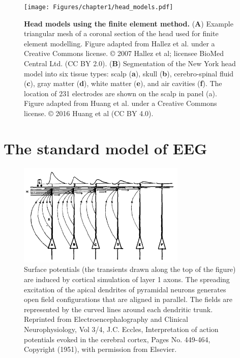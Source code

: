 \begin{figure}[t!]
    \centering
    \texttt{[image: Figures/chapter1/head\_models.pdf]}
    
    \caption[Head models using the finite element method]{\textbf{Head models using the finite element method.} 
    (\textbf{A}) Example triangular mesh of a coronal section of the head used for finite element modelling. Figure adapted from Hallez et al. \cite{Hallez2007} under a Creative Commons license. © 2007 Hallez et al; licensee BioMed Central Ltd. (CC BY 2.0).
    (\textbf{B}) Segmentation of the New York head model into six tissue types: scalp (\textbf{a}), skull (\textbf{b}), cerebro-spinal fluid (\textbf{c}), gray matter (\textbf{d}), white matter (\textbf{e}), and air cavities (\textbf{f}). The location of 231 electrodes are shown on the scalp in panel (a). Figure adapted from Huang et al. \cite{Huang2016} under a Creative Commons license. © 2016 Huang et al (CC BY 4.0).
    } 
    \label{fig:FEM_mesh}
\end{figure}

\section{The standard model of EEG} \label{sec:standard_model}

\begin{figure}
\vspace{-15pt}
\includegraphics[width=80mm]{Figures/chapter1/Eccles_1951.png}
\vspace{-20pt}
\caption[Early model of EEG generation by Eccles (1951)]{ Surface potentials (the transients drawn along the top of the figure) are induced by cortical simulation of layer 1 axons. The spreading excitation of the apical dendrites of pyramidal neurons generates open field configurations that are aligned in parallel. The fields are represented by the curved lines around each dendritic trunk. Reprinted from Electroencephalography and Clinical Neurophysiology, Vol 3/4, J.C. Eccles, Interpretation of action potentials evoked in the cerebral cortex, Pages No. 449-464, Copyright (1951), with permission from Elsevier.
} \label{fig:eccles}
\end{figure}

